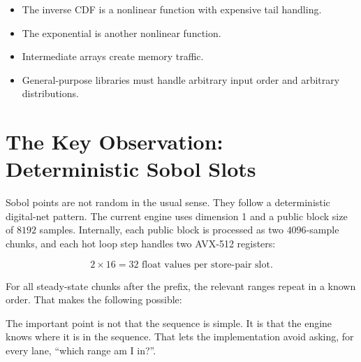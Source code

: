 \documentclass[11pt,a4paper]{article}
\begin{document}
\begin{itemize}
  \item The inverse CDF is a nonlinear function with expensive tail handling.
  \item The exponential is another nonlinear function.
  \item Intermediate arrays create memory traffic.
  \item General-purpose libraries must handle arbitrary input order and
        arbitrary distributions.
\end{itemize}

\section{The Key Observation: Deterministic Sobol Slots}

Sobol points are not random in the usual sense. They follow a deterministic
digital-net pattern. The current engine uses dimension 1 and a public block size
of \(8192\) samples. Internally, each public block is processed as two
\(4096\)-sample chunks, and each hot loop step handles two AVX-512 registers:

\[
  2 \times 16 = 32 \text{ float values per store-pair slot.}
\]

For all steady-state chunks after the prefix, the relevant ranges repeat in a
known order. That makes the following possible:

\begin{center}
\end{center}

The important point is not that the sequence is simple. It is that the engine
knows where it is in the sequence. That lets the implementation avoid asking,
for every lane, ``which range am I in?''.
\end{document}
